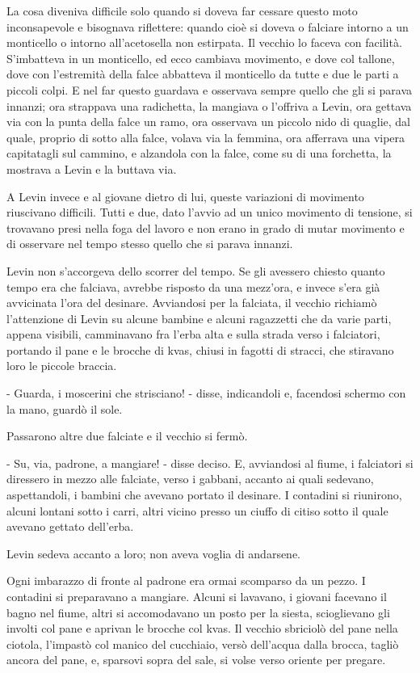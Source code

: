 La cosa diveniva difficile solo quando si doveva far cessare questo moto inconsapevole e bisognava riflettere: quando cioè si doveva o falciare intorno a un monticello o intorno all'acetosella non estirpata. Il vecchio lo faceva con facilità. S'imbatteva in un monticello, ed ecco cambiava movimento, e dove col tallone, dove con l'estremità della falce abbatteva il monticello da tutte e due le parti a piccoli colpi. E nel far questo guardava e osservava sempre quello che gli si parava innanzi; ora strappava una radichetta, la mangiava o l'offriva a Levin, ora gettava via con la punta della falce un ramo, ora osservava un piccolo nido di quaglie, dal quale, proprio di sotto alla falce, volava via la femmina, ora afferrava una vipera capitatagli sul cammino, e alzandola con la falce, come su di una forchetta, la mostrava a Levin e la buttava via. 

A Levin invece e al giovane dietro di lui, queste variazioni di movimento riuscivano difficili. Tutti e due, dato l'avvio ad un unico movimento di tensione, si trovavano presi nella foga del lavoro e non erano in grado di mutar movimento e di osservare nel tempo stesso quello che si parava innanzi. 

Levin non s'accorgeva dello scorrer del tempo. Se gli avessero chiesto quanto tempo era che falciava, avrebbe risposto da una mezz'ora, e invece s'era già avvicinata l'ora del desinare. Avviandosi per la falciata, il vecchio richiamò l'attenzione di Levin su alcune bambine e alcuni ragazzetti che da varie parti, appena visibili, camminavano fra l'erba alta e sulla strada verso i falciatori, portando il pane e le brocche di kvas, chiusi in fagotti di stracci, che stiravano loro le piccole braccia. 

- Guarda, i moscerini che strisciano! - disse, indicandoli e, facendosi schermo con la mano, guardò il sole. 

Passarono altre due falciate e il vecchio si fermò. 

- Su, via, padrone, a mangiare! - disse deciso. E, avviandosi al fiume, i falciatori si diressero in mezzo alle falciate, verso i gabbani, accanto ai quali sedevano, aspettandoli, i bambini che avevano portato il desinare. I contadini si riunirono, alcuni lontani sotto i carri, altri vicino presso un ciuffo di citiso sotto il quale avevano gettato dell'erba. 

Levin sedeva accanto a loro; non aveva voglia di andarsene. 

Ogni imbarazzo di fronte al padrone era ormai scomparso da un pezzo. I contadini si preparavano a mangiare. Alcuni si lavavano, i giovani facevano il bagno nel fiume, altri si accomodavano un posto per la siesta, scioglievano gli involti col pane e aprivan le brocche col kvas. Il vecchio sbriciolò del pane nella ciotola, l'impastò col manico del cucchiaio, versò dell'acqua dalla brocca, tagliò ancora del pane, e, sparsovi sopra del sale, si volse verso oriente per pregare. 

